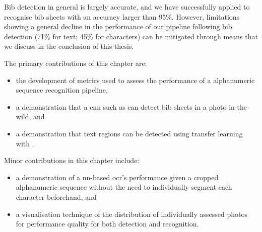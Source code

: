 Bib detection in general is largely accurate, and we have successfully applied \frcnn{} to recognise bib sheets with an accuracy larger than 95\%. However, limitations showing a general decline in the performance of our pipeline following bib detection (71\% for text; 45\% for characters) can be mitigated through means that we discuss in the conclusion of this thesis.

\bigskip

\noindent
The primary contributions of this chapter are:

\begin{itemize}
  \item the development of metrics used to assess the performance of a alphanumeric sequence recognition pipeline,
  \item a demonstration that a \gls{cnn} such as \frcnn{} can detect bib sheets in a photo in-the-wild, and
  \item a demonstration that text regions can be detected using transfer learning with \frcnn{}.
\end{itemize}

\noindent
Minor contributions in this chapter include:

\begin{itemize}
  \item a demonstration of a \gls{nn}-based \gls{ocr}'s performance given a cropped alphanumeric sequence without the need to individually segment each character beforehand, and
  \item a visualisation technique of the distribution of individually assessed photos for performance quality for both detection and recognition.
\end{itemize}






